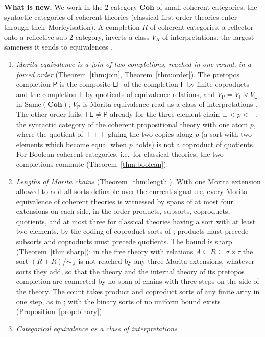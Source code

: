 \documentclass[11pt]{amsart}
\theoremstyle{definition}
\newcommand{\Same}{\mathrm{Same}}
\newcommand{\Coh}{\mathbf{Coh}}
\newcommand{\FF}{\mathsf F}
\newcommand{\EE}{\mathsf E}
\newcommand{\PP}{\mathsf P}
\begin{document}
\medskip
\noindent\textbf{What is new.} We work in the $2$-category $\Coh$ of
small coherent categories, the syntactic categories of coherent
theories (classical first-order theories enter through their
Morleyisation). A completion $R$ of coherent categories, a reflector
onto a reflective sub-$2$-category, inverts a class $V_R$ of
interpretations, the largest sameness it sends to equivalences
\cite[Prop.~5.1]{Same}.
\begin{enumerate}
\item[(a)] \emph{Morita equivalence is a join of two completions,
reached in one round, in a forced order} (Theorem~\ref{thm:join},
Theorem~\ref{thm:order}). The pretopos completion $\PP$ is the
composite $\EE\FF$ of the completion $\FF$ by finite coproducts and the
completion $\EE$ by quotients of equivalence relations, and $V_\PP=
V_\FF\vee V_\EE$ in $\Same(\Coh)$; $V_\PP$ is Morita equivalence read
as a class of interpretations \cite{Tsem17}. The other order fails:
$\FF\EE\ne\PP$ already for the three-element chain $\bot<p<\top$, the
syntactic category of the coherent propositional theory with one atom
$p$, where the quotient of $\top+\top$ gluing the two copies along $p$
(a sort with two elements which become equal when $p$ holds) is not a
coproduct of quotients. For Boolean coherent categories, i.e.\ for
classical theories, the two completions commute
(Theorem~\ref{thm:boolean}).
\item[(b)] \emph{Lengths of Morita chains} (Theorem~\ref{thm:length}).
With one Morita extension allowed to add all sorts definable over the
current signature, every Morita equivalence of coherent theories is
witnessed by spans of at most four extensions on each side, in the order
products, subsorts, coproducts, quotients, and at most three for
classical theories having a sort with at least two elements, by the
coding of coproduct sorts of \cite[Prop.~5.11]{McEl20}; products must
precede subsorts and coproducts must precede quotients. The bound is
sharp (Theorem~\ref{thm:sharp}): in the free theory with relations
$A\subseteq R\subseteq\sigma\times\tau$ the sort $(R+R)/{\sim_A}$ is not
reached by any three Morita extensions, whatever sorts they add, so that
the theory and the internal theory of its pretopos completion are
connected by no span of chains with three steps on the side of the
theory. The count takes
product and coproduct sorts of any finite arity in one step, as in
\cite{Tsem17}; with the binary sorts of \cite{BH16} no uniform bound
exists (Proposition~\ref{prop:binary}).
\item[(c)] \emph{Categorical equivalence as a class of interpretations
}
\end{enumerate}
\end{document}
